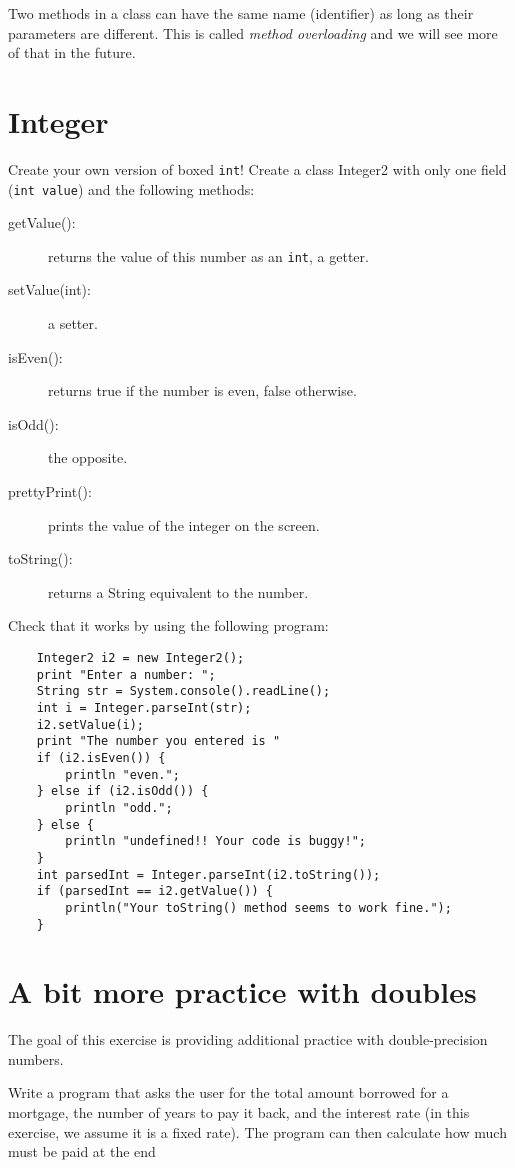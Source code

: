 \documentclass{article}
\begin{document}
Two methods in a class can have the same name (identifier) as long as
their parameters are different. This is called \emph{method
  overloading} and we will see more of that in the future.

\section{Integer}
\label{sec:integer}

Create your own version of boxed \verb+int+! Create a class Integer2
with only one field (\verb+int value+) and the following methods: 

\begin{description}
\item[getValue(): ] returns the value of this number as an
  \verb+int+, a getter. 
\item[setValue(int): ] a setter.
\item[isEven(): ] returns true if the number is even, false
  otherwise.
\item[isOdd(): ] the opposite.
\item[prettyPrint(): ] prints the value of the integer on the screen.
\item[toString(): ] returns a String equivalent to the number. 
\end{description}

Check that it works by using the following program: 

\begin{verbatim}
    Integer2 i2 = new Integer2();
    print "Enter a number: ";
    String str = System.console().readLine();
    int i = Integer.parseInt(str);
    i2.setValue(i);
    print "The number you entered is " 
    if (i2.isEven()) {
        println "even.";
    } else if (i2.isOdd()) {
        println "odd.";
    } else {
        println "undefined!! Your code is buggy!";
    }
    int parsedInt = Integer.parseInt(i2.toString());
    if (parsedInt == i2.getValue()) {
        println("Your toString() method seems to work fine.");
    }
\end{verbatim}

\section{A bit more practice with doubles}
\label{sec:bit-more-practice}

The goal of this exercise is providing additional practice with
double-precision numbers. 

Write a program that asks the user for the total amount borrowed for a
mortgage, the number of years to pay it back, and the interest rate
(in this exercise, we assume it is a fixed 
rate). The program can then calculate how much must be paid at the end
\end{document}
